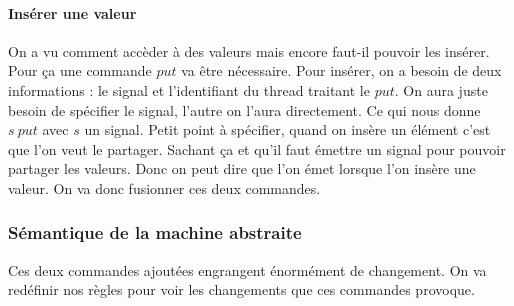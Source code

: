 \documentclass[10pt,a4paper]{article}
\begin{document}
					
				\paragraph{Insérer une valeur}
				
					On a vu comment accèder à des valeurs mais encore faut-il pouvoir les insérer. Pour ça une commande $put$ va être nécessaire. Pour insérer, on a besoin de deux informations : le signal et l'identifiant du thread traitant le $put$. On aura juste besoin de spécifier le signal, l'autre on l'aura directement. Ce qui nous donne $s~put$ avec $s$ un signal. 
					\smallbreak
					Petit point à spécifier, quand on insère un élément c'est que l'on veut le partager. Sachant ça et qu'il faut émettre un signal pour pouvoir partager les valeurs. Donc on peut dire que l'on émet lorsque l'on insère une valeur. On va donc fusionner ces deux commandes. 
					\bigbreak
					\bigbreak
						
				
			
			
			\subsubsection{Sémantique de la machine abstraite}
				
				Ces deux commandes ajoutées engrangent énormément de changement. On va redéfinir nos règles pour voir les changements que ces commandes provoque. 
				\bigbreak
		
\end{document}
